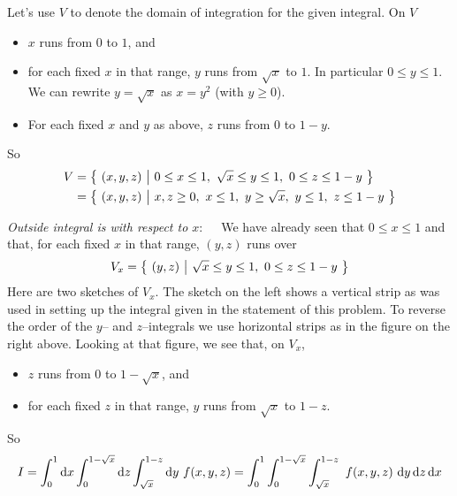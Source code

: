 \begin{solution}
Let's use $V$ to denote the domain of integration for the given integral.
On $V$
\begin{itemize}
\item 
$x$ runs from $0$ to $1$, and
\item 
for each fixed $x$ in that range, $y$ runs from $\sqrt{x}$ to $1$.
In particular $0\le y\le 1$.
We can rewrite $y=\sqrt{x}$ as $x=y^2$ (with $y\ge 0$).
\item
For each fixed $x$ and $y$ as above, $z$ runs from $0$ to $1-y$.
\end{itemize}
So
\begin{align*}
V &= \Set{(x,y,z)}{0\le x\le 1,\ \sqrt{x}\le y\le 1,\ 0\le z\le 1-y} \\
  &=  \Set{(x,y,z)}{x,z\ge 0,\ x\le 1,\ y\ge \sqrt{x},\ y\le 1,\ z\le 1-y}
\end{align*}


\emph{Outside integral is with respect to $x$}:\ \ \ 
We have already seen that $0\le x\le 1$ and that, for each fixed $x$ in 
that range, $(y,z)$ runs over
\begin{equation*}
V_x =\big\{ \ (y,z)\ \big|\ \sqrt{x}\le y\le 1,\ 0\le z\le 1-y\ \big\}
\end{equation*}
Here are two sketches of $V_x$. The sketch on the left shows
a vertical strip as was used in setting up the integral given in the statement
of this problem.
To reverse the order of the $y$-- and $z$--integrals we use 
horizontal strips as in the figure on the right above.
Looking at that figure, we see that, on $V_x$,
\begin{itemize}
\item
$z$ runs from $0$ to $1-\sqrt{x}$, and
\item
for each fixed $z$ in that range, $y$ runs from $\sqrt{x}$ to $1-z$.
\end{itemize}
So
\begin{align*}
I = \int_0^1\mathrm{d}x \int_0^{1-\sqrt{x}}\mathrm{d}z \int_{\sqrt{x}}^{1-z}\mathrm{d}y
                \ f(x,y,z)
= \int_0^1 \int_0^{1-\sqrt{x}} \int_{\sqrt{x}}^{1-z}
                \ f(x,y,z)\  \mathrm{d}y\,\mathrm{d}z\,\mathrm{d}x
\end{align*}


\end{solution}
